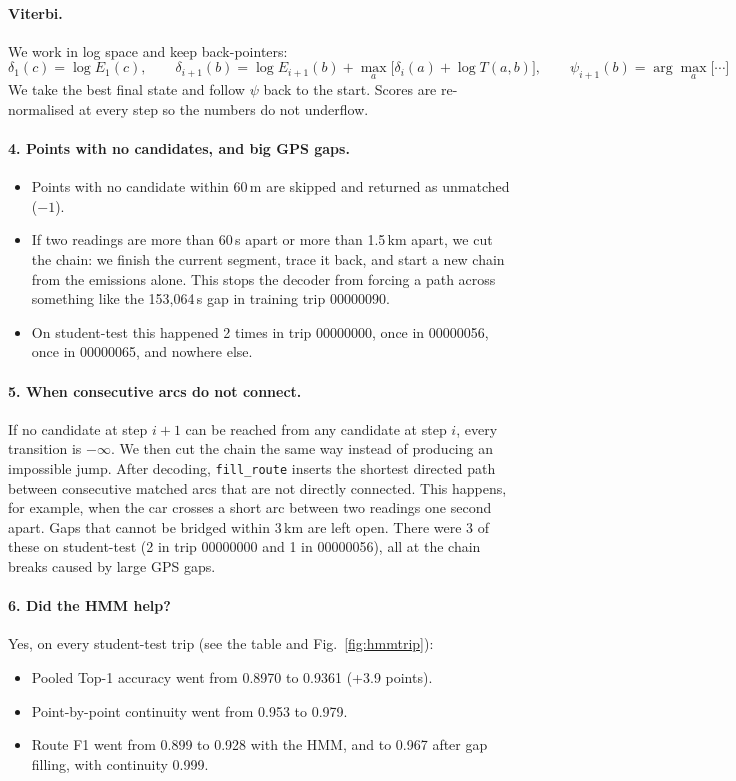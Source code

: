 \documentclass[11pt,a4paper]{article}
\newcommand{\code}[1]{\texttt{\small #1}}
\begin{document}
\paragraph{Viterbi.}
We work in log space and keep back-pointers:
\[
\delta_1(c) = \log E_1(c), \qquad
\delta_{i+1}(b) = \log E_{i+1}(b) + \max_a\big[\delta_i(a) + \log T(a,b)\big], \qquad
\psi_{i+1}(b) = \arg\max_a\big[\cdots\big]
\]
We take the best final state and follow $\psi$ back to the start. Scores are re-normalised at every step so
the numbers do not underflow.

\paragraph{4. Points with no candidates, and big GPS gaps.}
\begin{itemize}
  \item Points with no candidate within 60\,m are skipped and returned as unmatched ($-1$).
  \item If two readings are more than 60\,s apart or more than 1.5\,km apart, we cut the chain: we finish
        the current segment, trace it back, and start a new chain from the emissions alone. This stops the
        decoder from forcing a path across something like the 153,064\,s gap in training trip 00000090.
  \item On student-test this happened 2 times in trip 00000000, once in 00000056, once in 00000065, and
        nowhere else.
\end{itemize}

\paragraph{5. When consecutive arcs do not connect.}
If no candidate at step $i+1$ can be reached from any candidate at step $i$, every transition is $-\infty$.
We then cut the chain the same way instead of producing an impossible jump. After decoding,
\code{fill\_route} inserts the shortest directed path between consecutive matched arcs that are not directly
connected. This happens, for example, when the car crosses a short arc between two readings one second
apart. Gaps that cannot be bridged within 3\,km are left open. There were 3 of these on student-test (2 in
trip 00000000 and 1 in 00000056), all at the chain breaks caused by large GPS gaps.

\paragraph{6. Did the HMM help?}
Yes, on every student-test trip (see the table and Fig.~\ref{fig:hmmtrip}):
\begin{itemize}
  \item Pooled Top-1 accuracy went from 0.8970 to 0.9361 (+3.9 points).
  \item Point-by-point continuity went from 0.953 to 0.979.
  \item Route F1 went from 0.899 to 0.928 with the HMM, and to 0.967 after gap filling, with continuity
        0.999.
\end{itemize}
\end{document}
